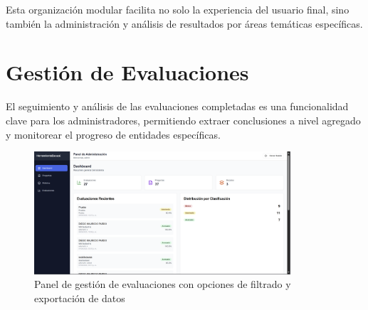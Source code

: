 \documentclass[12pt,a4paper]{report}
\begin{document}
Esta organización modular facilita no solo la experiencia del usuario final, sino también la administración y análisis de resultados por áreas temáticas específicas.

\section{Gestión de Evaluaciones}
El seguimiento y análisis de las evaluaciones completadas es una funcionalidad clave para los administradores, permitiendo extraer conclusiones a nivel agregado y monitorear el progreso de entidades específicas.

\begin{figure}[h]
    \centering
    \includegraphics[width=0.85\textwidth]{Captura de pantalla 2025-06-26 122831.png}
    \caption{Panel de gestión de evaluaciones con opciones de filtrado y exportación de datos}
\end{figure}
\end{document}
